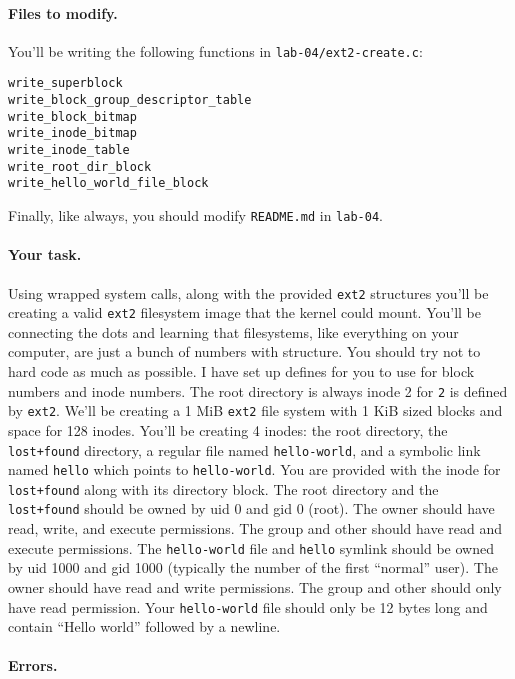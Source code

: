 \paragraph{Files to modify.}

You'll be writing the following functions in \texttt{lab-04/ext2-create.c}:

\begin{lstlisting}
write_superblock
write_block_group_descriptor_table
write_block_bitmap
write_inode_bitmap
write_inode_table
write_root_dir_block
write_hello_world_file_block
\end{lstlisting}

Finally, like always, you should modify \texttt{README.md} in \texttt{lab-04}.

\paragraph{Your task.}

Using wrapped system calls, along with the provided \texttt{ext2} structures
you'll be creating a valid \texttt{ext2} filesystem image that the kernel
could mount.
You'll be connecting the dots and learning that filesystems, like everything
on your computer, are just a bunch of numbers with structure.
You should try not to hard code as much as possible.
I have set up defines for you to use for block numbers and inode numbers.
The root directory is always inode 2 for \texttt{2} is defined by \texttt{ext2}.
We'll be creating a 1 MiB \texttt{ext2} file system with 1 KiB sized blocks
and space for 128 inodes.
You'll be creating 4 inodes: the root directory, the \lstinline|lost+found|
directory, a regular file named \texttt{hello-world}, and a symbolic link
named \texttt{hello} which points to \texttt{hello-world}.
You are provided with the inode for \lstinline|lost+found| along with its
directory block.
The root directory and the \lstinline|lost+found| should be owned by uid 0
and gid 0 (root).
The owner should have read, write, and execute permissions.
The group and other should have read and execute permissions.
The \lstinline|hello-world| file and \lstinline|hello| symlink should be
owned by uid 1000 and gid 1000 (typically the number of the first ``normal''
user).
The owner should have read and write permissions.
The group and other should only have read permission.
Your \lstinline|hello-world| file should only be 12 bytes long and contain
``Hello world'' followed by a newline.

\paragraph{Errors.}

